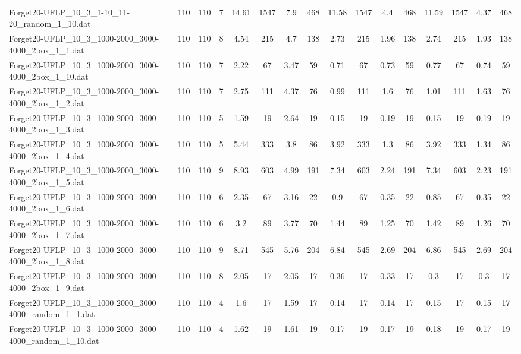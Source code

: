 \begin{sidewaystable}[!ht]
{\begin{tabular}{lccccccccccccccc}
Forget20-UFLP\_10\_3\_1-10\_11-20\_random\_1\_10.dat & 110 & 110 & 7 & 14.61 & 1547 & 7.9 & 468 & 11.58 & 1547 & 4.4 & 468 & 11.59 & 1547 &  \textcolor{blue2}{4.37} & 468 \\
Forget20-UFLP\_10\_3\_1000-2000\_3000-4000\_2box\_1\_1.dat & 110 & 110 & 8 & 4.54 & 215 & 4.7 & 138 & 2.73 & 215 & 1.96 & 138 & 2.74 & 215 & 1.93 & 138 \\
Forget20-UFLP\_10\_3\_1000-2000\_3000-4000\_2box\_1\_10.dat & 110 & 110 & 7 & 2.22 & 67 & 3.47 & 59 & 0.71 & 67 & 0.73 & 59 & 0.77 & 67 & 0.74 & 59 \\
Forget20-UFLP\_10\_3\_1000-2000\_3000-4000\_2box\_1\_2.dat & 110 & 110 & 7 & 2.75 & 111 & 4.37 & 76 &  \textcolor{blue2}{0.99} & 111 & 1.6 & 76 & 1.01 & 111 & 1.63 & 76 \\
Forget20-UFLP\_10\_3\_1000-2000\_3000-4000\_2box\_1\_3.dat & 110 & 110 & 5 & 1.59 & 19 & 2.64 & 19 &  \textcolor{blue2}{0.15} & 19 & 0.19 & 19 &  \textcolor{blue2}{0.15} & 19 & 0.19 & 19 \\
Forget20-UFLP\_10\_3\_1000-2000\_3000-4000\_2box\_1\_4.dat & 110 & 110 & 5 & 5.44 & 333 & 3.8 & 86 & 3.92 & 333 & 1.3 & 86 & 3.92 & 333 & 1.34 & 86 \\
Forget20-UFLP\_10\_3\_1000-2000\_3000-4000\_2box\_1\_5.dat & 110 & 110 & 9 & 8.93 & 603 & 4.99 & 191 & 7.34 & 603 & 2.24 & 191 & 7.34 & 603 & 2.23 & 191 \\
Forget20-UFLP\_10\_3\_1000-2000\_3000-4000\_2box\_1\_6.dat & 110 & 110 & 6 & 2.35 & 67 & 3.16 & 22 & 0.9 & 67 &  \textcolor{blue2}{0.35} & 22 & 0.85 & 67 &  \textcolor{blue2}{0.35} & 22 \\
Forget20-UFLP\_10\_3\_1000-2000\_3000-4000\_2box\_1\_7.dat & 110 & 110 & 6 & 3.2 & 89 & 3.77 & 70 & 1.44 & 89 & 1.25 & 70 & 1.42 & 89 & 1.26 & 70 \\
Forget20-UFLP\_10\_3\_1000-2000\_3000-4000\_2box\_1\_8.dat & 110 & 110 & 9 & 8.71 & 545 & 5.76 & 204 & 6.84 & 545 & 2.69 & 204 & 6.86 & 545 & 2.69 & 204 \\
Forget20-UFLP\_10\_3\_1000-2000\_3000-4000\_2box\_1\_9.dat & 110 & 110 & 8 & 2.05 & 17 & 2.05 & 17 & 0.36 & 17 & 0.33 & 17 &  \textcolor{blue2}{0.3} & 17 &  \textcolor{blue2}{0.3} & 17 \\
Forget20-UFLP\_10\_3\_1000-2000\_3000-4000\_random\_1\_1.dat & 110 & 110 & 4 & 1.6 & 17 & 1.59 & 17 &  \textcolor{blue2}{0.14} & 17 &  \textcolor{blue2}{0.14} & 17 & 0.15 & 17 & 0.15 & 17 \\
Forget20-UFLP\_10\_3\_1000-2000\_3000-4000\_random\_1\_10.dat & 110 & 110 & 4 & 1.62 & 19 & 1.61 & 19 &  \textcolor{blue2}{0.17} & 19 &  \textcolor{blue2}{0.17} & 19 & 0.18 & 19 &  \textcolor{blue2}{0.17} & 19 \\

\end{tabular}}
\end{sidewaystable}
